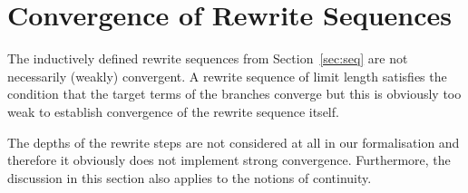 \section{Convergence of Rewrite Sequences}\label{sec:convergence}

The inductively defined rewrite sequences from Section~\ref{sec:seq}
are not necessarily (weakly) convergent. A rewrite sequence of limit
length satisfies the condition that the target terms of the
 branches converge but
this is obviously too weak to establish convergence of the rewrite
sequence itself.

The depths of the rewrite steps are not considered at all in our
formalisation and therefore it obviously does not implement strong
convergence. Furthermore, the discussion in this section also applies
to the notions of continuity.

